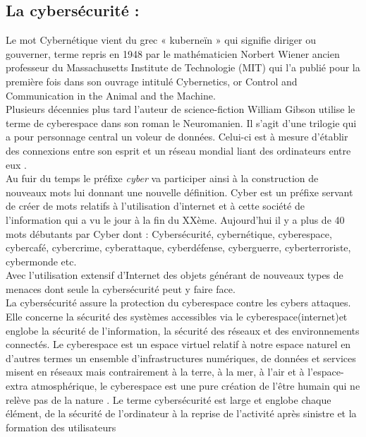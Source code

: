 \subsection{La cybersécurité :}
Le mot Cybernétique vient du grec « kuberneïn » qui signifie diriger ou gouverner, terme repris en 1948 par le mathématicien Norbert Wiener ancien professeur du Massachusetts Institute de Technologie (MIT) qui l’a publié pour la première fois dans son ouvrage intitulé Cybernetics, or Control and Communication in the Animal and the Machine\cite{cybernetics}.\\
Plusieurs décennies plus tard l’auteur de science-fiction William Gibson utilise le terme de cyberespace dans son roman le Neuromanien. Il s’agit d’une trilogie qui a pour personnage central un voleur de données. Celui-ci est à mesure d’établir des connexions entre son esprit et un réseau mondial liant des ordinateurs entre eux \cite{neuromacer}.\\
Au fuir du temps le préfixe \textit{cyber} va participer ainsi à la construction de nouveaux mots lui donnant une nouvelle définition. Cyber est un préfixe servant de créer de mots relatifs à l’utilisation d’internet et à cette société de l’information qui a vu le jour à la fin du XXème. Aujourd’hui il y a plus de 40 mots débutants par Cyber dont : Cybersécurité, cybernétique, cyberespace, cybercafé, cybercrime, cyberattaque, cyberdéfense, cyberguerre, cyberterroriste, cybermonde etc.\\Avec l’utilisation extensif d’Internet des objets générant de nouveaux types de menaces dont seule la cybersécurité peut y faire face.\\
La cybersécurité assure la protection du cyberespace contre les cybers attaques. Elle concerne la sécurité des systèmes accessibles via le cyberespace(internet)et englobe la sécurité de l’information, la sécurité des réseaux et des environnements connectés. Le cyberespace est un espace virtuel relatif à notre espace naturel en d’autres termes un ensemble d’infrastructures numériques, de données et services misent en réseaux mais contrairement à la terre, à la mer, à l’air et à l’espace-extra atmosphérique, le cyberespace est une pure création de l’être humain qui ne relève pas de la nature \cite{ref4}. Le terme cybersécurité est large et englobe chaque élément, de la sécurité de l’ordinateur à la reprise de l’activité après sinistre et la formation des utilisateurs \cite{ref8}

